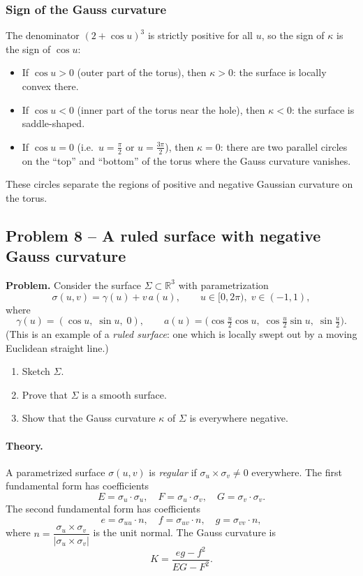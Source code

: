 \documentclass[12pt,a4paper]{article}
\theoremstyle{plain}
\theoremstyle{definition}      %
\begin{document}
\subsubsection*{Sign of the Gauss curvature}

The denominator $(2+\cos u)^3$ is strictly positive for all $u$, so the
sign of $\kappa$ is the sign of $\cos u$:

\begin{itemize}
	\item If $\cos u>0$ (outer part of the torus), then $\kappa>0$:
	the surface is locally convex there.
	\item If $\cos u<0$ (inner part of the torus near the hole), then
	$\kappa<0$: the surface is saddle-shaped.
	\item If $\cos u=0$ (i.e.\ $u=\frac{\pi}{2}$ or $u=\frac{3\pi}{2}$),
	then $\kappa=0$: there are two parallel circles on the ``top''
	and ``bottom'' of the torus where the Gauss curvature vanishes.
\end{itemize}
These circles separate the regions of positive and negative Gaussian
curvature on the torus.
	
	
	
\subsection*{Problem 8 – A ruled surface with negative Gauss curvature}

\textbf{Problem.}
Consider the surface $\Sigma \subset \mathbb{R}^3$ with parametrization
\[
\sigma(u,v)=\gamma(u)+v\,a(u),\qquad
u\in[0,2\pi),\; v\in(-1,1),
\]
where
\[
\gamma(u)=(\cos u,\;\sin u,\;0),\qquad
a(u)=\bigl(\cos\tfrac u2\cos u,\;\cos\tfrac u2\sin u,\;\sin\tfrac u2\bigr).
\]
(This is an example of a \emph{ruled surface}: one which is locally swept out
by a moving Euclidean straight line.)

\begin{enumerate}
	\item Sketch $\Sigma$.
	\item Prove that $\Sigma$ is a smooth surface.
	\item Show that the Gauss curvature $\kappa$ of $\Sigma$ is everywhere negative.
\end{enumerate}

\paragraph{Theory.}
A parametrized surface $\sigma(u,v)$ is \emph{regular} if
$\sigma_u\times\sigma_v\neq 0$ everywhere.
The first fundamental form has coefficients
\[
E=\sigma_u\cdot\sigma_u,\quad
F=\sigma_u\cdot\sigma_v,\quad
G=\sigma_v\cdot\sigma_v.
\]
The second fundamental form has coefficients
\[
e=\sigma_{uu}\cdot n,\quad
f=\sigma_{uv}\cdot n,\quad
g=\sigma_{vv}\cdot n,
\]
where $n=\dfrac{\sigma_u\times\sigma_v}{|\sigma_u\times\sigma_v|}$ is the unit normal.
The Gauss curvature is
\[
K=\frac{eg-f^2}{EG-F^2}.
\]
\end{document}
